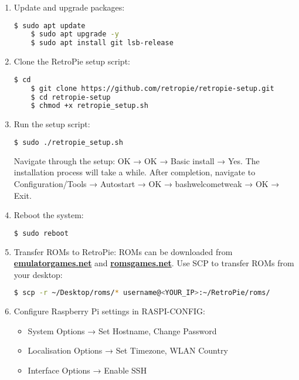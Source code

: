 \begin{enumerate}
    \item Update and upgrade packages:
    \begin{lstlisting}[language=bash, breaklines=true, breakatwhitespace=true, columns=fullflexible]
    $ sudo apt update
    $ sudo apt upgrade -y
    $ sudo apt install git lsb-release
    \end{lstlisting}

   \item Clone the RetroPie setup script:
    \begin{lstlisting}[language=bash, breaklines=true, breakatwhitespace=true, columns=fullflexible]
    $ cd
    $ git clone https://github.com/retropie/retropie-setup.git
    $ cd retropie-setup
    $ chmod +x retropie_setup.sh
    \end{lstlisting}

    \item Run the setup script:
    \begin{lstlisting}[language=bash, breaklines=true, breakatwhitespace=true, columns=fullflexible]
    $ sudo ./retropie_setup.sh
    \end{lstlisting}
    Navigate through the setup: OK → OK → Basic install → Yes. The installation process will take a while. After completion, navigate to Configuration/Tools → Autostart → OK → bashwelcometweak → OK → Exit.

    \item Reboot the system:
    \begin{lstlisting}[language=bash, breaklines=true, breakatwhitespace=true, columns=fullflexible]
    $ sudo reboot
    \end{lstlisting}

    \item Transfer ROMs to RetroPie:
    ROMs can be downloaded from \href{https://www.emulatorgames.net}{\textbf{\color{blue}emulatorgames.net}} and \href{https://www.romsgames.net}{\textbf{\color{blue}romsgames.net}}. Use SCP to transfer ROMs from your desktop:
    \begin{lstlisting}[language=bash, breaklines=true, breakatwhitespace=true, columns=fullflexible]
    $ scp -r ~/Desktop/roms/* username@<YOUR_IP>:~/RetroPie/roms/
    \end{lstlisting}

    \item Configure Raspberry Pi settings in RASPI-CONFIG:
    \begin{itemize}
        \item System Options → Set Hostname, Change Password
        \item Localisation Options → Set Timezone, WLAN Country
        \item Interface Options → Enable SSH
    \end{itemize}


\end{enumerate}
